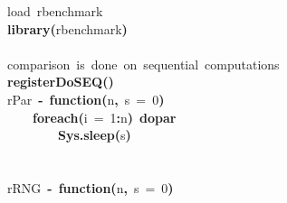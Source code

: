 \documentclass[a4paper,12pt]{article}\usepackage{graphicx, color}
\makeatletter
\newcommand{\hlnumber}[1]{\textcolor[rgb]{0,0,0}{#1}}%
\newcommand{\hlfunctioncall}[1]{\textcolor[rgb]{0.501960784313725,0,0.329411764705882}{\textbf{#1}}}%
\newcommand{\hlkeyword}[1]{\textcolor[rgb]{0,0,0}{\textbf{#1}}}%
\newcommand{\hlargument}[1]{\textcolor[rgb]{0.690196078431373,0.250980392156863,0.0196078431372549}{#1}}%
\newcommand{\hlcomment}[1]{\textcolor[rgb]{0.180392156862745,0.6,0.341176470588235}{#1}}%
\newcommand{\hlformalargs}[1]{\textcolor[rgb]{0.690196078431373,0.250980392156863,0.0196078431372549}{#1}}%
\newcommand{\hleqformalargs}[1]{\textcolor[rgb]{0.690196078431373,0.250980392156863,0.0196078431372549}{#1}}%
\newcommand{\hlassignement}[1]{\textcolor[rgb]{0,0,0}{\textbf{#1}}}%
\newcommand{\hlsymbol}[1]{\textcolor[rgb]{0,0,0}{#1}}%
\newcommand{\hlstd}[1]{\textcolor[rgb]{0,0,0}{#1}}%
\newenvironment{kframe}{%
 \def\FrameCommand##1{\hskip\@totalleftmargin \hskip-\fboxsep
 \colorbox{shadecolor}{##1}\hskip-\fboxsep
     \hskip-\linewidth \hskip-\@totalleftmargin \hskip\columnwidth}%
 \MakeFramed {\advance\hsize-\width
   \@totalleftmargin\z@ \linewidth\hsize
   \@setminipage}}%
 {\par\unskip\endMakeFramed}
\newenvironment{knitrout}{}{} %
\renewenvironment{knitrout}{\begin{footnotesize}}{\end{footnotesize}}
\makeatother
\begin{document}
\begin{knitrout}
\color{fgcolor}\begin{kframe}
\begin{flushleft}
\ttfamily\noindent
\hlcomment{\usebox{\hlnormalsizeboxhash}{\ }load{\ }rbenchmark}\hspace*{\fill}\\
\hlstd{}\hlfunctioncall{library}\hlkeyword{(}\hlsymbol{rbenchmark}\hlkeyword{)}\hspace*{\fill}\\
\hlstd{}\hspace*{\fill}\\
\hlstd{}\hlcomment{\usebox{\hlnormalsizeboxhash}{\ }comparison{\ }is{\ }done{\ }on{\ }sequential{\ }computations}\hspace*{\fill}\\
\hlstd{}\hlfunctioncall{registerDoSEQ}\hlkeyword{(}\hlkeyword{)}\hspace*{\fill}\\
\hlstd{}\hlsymbol{rPar}{\ }\hlassignement{\usebox{\hlnormalsizeboxlessthan}-}{\ }\hlkeyword{function}\hlkeyword{(}\hlformalargs{n}\hlkeyword{,}{\ }\hlformalargs{s}{\ }\hleqformalargs{=}{\ }\hlnumber{0}\hlkeyword{)}{\ }\hlkeyword{\usebox{\hlnormalsizeboxopenbrace}}\hspace*{\fill}\\
\hlstd{}{\ }{\ }{\ }{\ }\hlfunctioncall{foreach}\hlkeyword{(}\hlargument{i}{\ }\hlargument{=}{\ }\hlnumber{1}\hlkeyword{:}\hlsymbol{n}\hlkeyword{)}{\ }\hlkeyword{\usebox{\hlnormalsizeboxpercent}dopar\usebox{\hlnormalsizeboxpercent}}{\ }\hlkeyword{\usebox{\hlnormalsizeboxopenbrace}}\hspace*{\fill}\\
\hlstd{}{\ }{\ }{\ }{\ }{\ }{\ }{\ }{\ }\hlfunctioncall{Sys.sleep}\hlkeyword{(}\hlsymbol{s}\hlkeyword{)}\hspace*{\fill}\\
\hlstd{}{\ }{\ }{\ }{\ }\hlkeyword{\usebox{\hlnormalsizeboxclosebrace}}\hspace*{\fill}\\
\hlstd{}\hlkeyword{\usebox{\hlnormalsizeboxclosebrace}}\hspace*{\fill}\\
\hlstd{}\hlsymbol{rRNG}{\ }\hlassignement{\usebox{\hlnormalsizeboxlessthan}-}{\ }\hlkeyword{function}\hlkeyword{(}\hlformalargs{n}\hlkeyword{,}{\ }\hlformalargs{s}{\ }\hleqformalargs{=}{\ }\hlnumber{0}\hlkeyword{)}{\ }\hlkeyword{\usebox{\hlnormalsizeboxopenbrace}}\hspace*{\fill}\\

\end{flushleft}
\end{kframe}
\end{knitrout}
\end{document}
